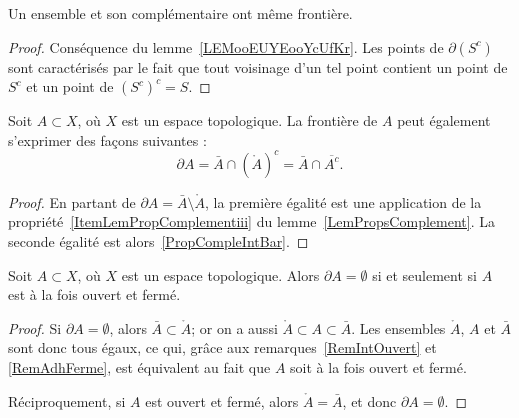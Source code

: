 \begin{corollary}
    Un ensemble et son complémentaire ont même frontière.
\end{corollary}

\begin{proof}
    Conséquence du lemme~\ref{LEMooEUYEooYcUfKr}. Les points de \( \partial(S^c)\) sont caractérisés par le fait que tout voisinage d'un tel point contient un point de \( S^c\) et un point de \( (S^c)^c=S\).
\end{proof}

\begin{lemma}
  Soit \( A \subset X \), où \( X \) est un espace topologique. La frontière de $A$ peut également s'exprimer des façons suivantes :
	\begin{equation}
		\partial A= \bar A\cap(\mathring A)^c = \bar A\cap\overline{ A^c}.
	\end{equation}
\end{lemma}

\begin{proof}
	En partant de $\partial A=\bar A\setminus \mathring A$, la première égalité est une application de la propriété~\ref{ItemLemPropComplementiii} du lemme~\ref{LemPropsComplement}. La seconde égalité est alors~\eqref{PropCompleIntBar}.
\end{proof}

\begin{lemma} \label{FrontiereVidePourOuvertsFermes}
  Soit \( A \subset X \), où \( X \) est un espace topologique. Alors \( \partial A = \emptyset \) si et seulement si \( A \) est à la fois ouvert et fermé.
\end{lemma}

\begin{proof}
  Si \( \partial A = \emptyset \), alors \( \bar A \subset \mathring A \); or on a aussi \( \mathring A \subset A \subset \bar A \). Les ensembles \( \mathring A \), \(A \) et \( \bar A \) sont donc tous égaux, ce qui, grâce aux remarques~\ref{RemIntOuvert} et \ref{RemAdhFerme}, est équivalent au fait que \( A \) soit à la fois ouvert et fermé.

  Réciproquement, si \( A \) est ouvert et fermé, alors \( \mathring A = \bar A \), et donc  \( \partial A = \emptyset \).
\end{proof}

